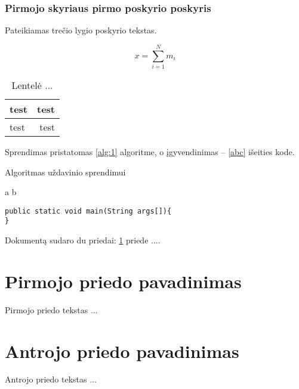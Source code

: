 \documentclass[a4paper,12pt,fleqn]{article}
\begin{document}
\subsubsection{Pirmojo skyriaus pirmo poskyrio poskyris}
\label{sec:data}
Pateikiamas trečio lygio poskyrio tekstas.

\begin{equation}
x = \sum_{i=1}^N m_i
\end{equation}

\begin{table}[!ht]\centering
\caption{Lentelė ... }
\label{tabl:table}
\begin{tabular}{l|r|}
test&test\\ \hline
test&test\\
\end{tabular}
\end{table}

Sprendimas pristatomas \ref{alg:1} algoritme, o įgyvendinimas -- \ref{abc} išeities kode.

\begin{algorithm}\caption{Algoritmas uždavinio sprendimui}
  \label{alg:1}
  \begin{algorithmic}
    \REQUIRE 
    \ENSURE 
\STATE a \AND b
\end{algorithmic}


\end{algorithm}



\begin{lstlisting}[caption={Pagrindinio metodo žingsniai},label={abc}]
public static void main(String args[]){
}
\end{lstlisting}








\newpage
\begin{appendices}
Dokumentą sudaro du priedai: \ref{app:a} priede  ....
\newpage
\section{Pirmojo priedo pavadinimas}
\label{app:a}
Pirmojo priedo tekstas ...

\newpage
\section{Antrojo priedo pavadinimas}
Antrojo priedo tekstas ...

\end{appendices}
\end{document}
